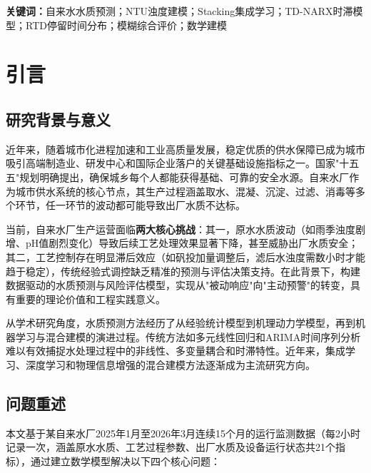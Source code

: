 \documentclass[12pt,a4paper]{ctexart}
\begin{document}
\vspace{1em}
\noindent\textbf{关键词：}自来水水质预测；NTU浊度建模；Stacking集成学习；TD-NARX时滞模型；RTD停留时间分布；模糊综合评价；数学建模

\newpage

\tableofcontents
\newpage

\section{引言}

\subsection{研究背景与意义}

近年来，随着城市化进程加速和工业高质量发展，稳定优质的供水保障已成为城市吸引高端制造业、研发中心和国际企业落户的关键基础设施指标之一。国家"十五五"规划明确提出，确保城乡每个人都能获得基础、可靠的安全水源。自来水厂作为城市供水系统的核心节点，其生产过程涵盖取水、混凝、沉淀、过滤、消毒等多个环节，任一环节的波动都可能导致出厂水质不达标。

当前，自来水厂生产运营面临\textbf{两大核心挑战}：其一，原水水质波动（如雨季浊度剧增、pH值剧烈变化）导致后续工艺处理效果显著下降，甚至威胁出厂水质安全；其二，工艺控制存在明显滞后效应（如矾投加量调整后，滤后水浊度需数小时才能趋于稳定），传统经验式调控缺乏精准的预测与评估决策支持。在此背景下，构建数据驱动的水质预测与风险评估模型，实现从"被动响应"向"主动预警"的转变，具有重要的理论价值和工程实践意义。

从学术研究角度，水质预测方法经历了从经验统计模型到机理动力学模型，再到机器学习与混合建模的演进过程。传统方法如多元线性回归和ARIMA时间序列分析难以有效捕捉水处理过程中的非线性、多变量耦合和时滞特性。近年来，集成学习、深度学习和物理信息增强的混合建模方法逐渐成为主流研究方向。

\subsection{问题重述}

本文基于某自来水厂2025年1月至2026年3月连续15个月的运行监测数据（每2小时记录一次，涵盖原水水质、工艺过程参数、出厂水质及设备运行状态共21个指标），通过建立数学模型解决以下四个核心问题：
\end{document}
